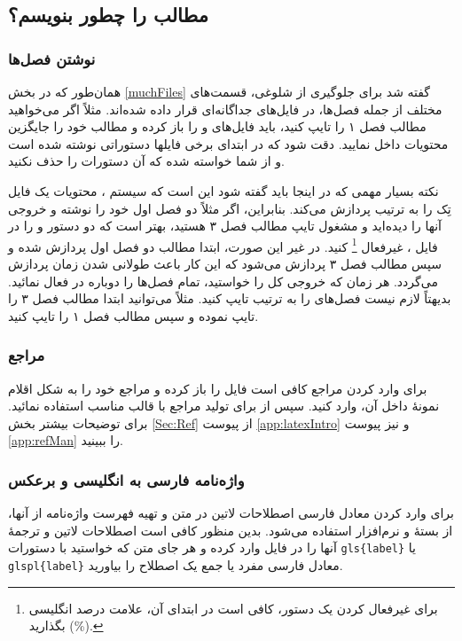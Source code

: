 \subsection[مطالب پایان‌نامه را چطور بنویسم؟]
{مطالب \پ را چطور بنویسم؟}
\subsubsection{نوشتن فصل‌ها}
همان‌طور که در بخش \ref{muchFiles} گفته شد برای جلوگیری از شلوغی، قسمت‌های مختلف \پ از جمله فصل‌ها، در فایل‌های جداگانه‌ای قرار داده شده‌اند.
مثلاً اگر می‌خواهید مطالب فصل ۱ را تایپ کنید، باید فایل‌های
و
را باز کرده و مطالب خود را جایگزین محتویات داخل
نمایید. دقت شود که در ابتدای برخی فایلها دستوراتی نوشته شده است و از شما خواسته شده که آن دستورات را حذف نکنید.


نکته بسیار مهمی که در اینجا باید گفته شود این است که سیستم \lr{\TeX}، محتویات یک فایل تِک را به ترتیب پردازش می‌کند.  بنابراین، اگر مثلاً  دو فصل اول خود را نوشته و خروجی آنها را دیده‌اید و مشغول تایپ مطالب فصل ۳ هستید، بهتر است
که دو دستور
\verb!!
و
\verb!!
را در فایل
،
غیرفعال%
\footnote{
	برای غیرفعال کردن یک دستور، کافی است در ابتدای آن، علامت درصد انگلیسی (\%) بگذارید.
}
کنید. در غیر این صورت، ابتدا مطالب دو فصل اول پردازش شده و سپس مطالب فصل ۳ پردازش می‌شود که این کار باعث طولانی شدن زمان پردازش می‌گردد. هر زمان که خروجی کل \پ را خواستید، تمام فصل‌ها را دوباره در
فعال نمائید.
بدیهتاً لازم نیست فصل‌های \پ را به ترتیب تایپ کنید. مثلاً می‌توانید ابتدا مطالب فصل ۳ را تایپ نموده و سپس مطالب فصل ۱ را تایپ کنید.
\subsubsection{مراجع}
برای وارد کردن مراجع \پ کافی است فایل
را باز کرده و مراجع خود را به شکل اقلام نمونهٔ داخل آن، وارد کنید.  سپس از  برای تولید مراجع با قالب مناسب استفاده نمائید. برای توضیحات بیشتر بخش \ref{Sec:Ref} از پیوست \ref{app:latexIntro} و نیز پیوست \ref{app:refMan} را ببینید.

\subsubsection{واژه‌نامه فارسی به انگلیسی و برعکس}
برای وارد کردن معادل فارسی اصطلاحات لاتین در متن و تهیه فهرست واژه‌نامه از آنها، از بستهٔ
و نرم‌افزار
استفاده می‌شود. بدین منظور کافی است اصطلاحات لاتین و ترجمهٔ آنها را در فایل
وارد کرده و هر جای متن که خواستید با دستورات
\verb|gls{label}|
یا \verb|glspl{label}|
معادل فارسی مفرد یا جمع یک اصطلاح را بیاورید.

